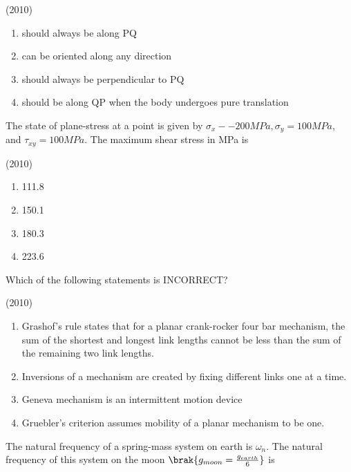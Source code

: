     \hfill{(2010)}

        
            \begin{enumerate}
                \item should always be along PQ
                \item can be oriented along any direction
                \item should always be perpendicular to PQ
                \item should be along QP when the body undergoes pure translation
            \end{enumerate}
        
		
    \item The state of plane-stress at a point is given by $\sigma_x--200MPa,\sigma_y=100MPa$, and $\tau_{xy}=100MPa$. The maximum shear stress in MPa is
    
    \hfill{(2010)}

        \begin{multicols}{4}
            \begin{enumerate}
                \item 111.8
                \item 150.1
                \item 180.3
                \item 223.6
            \end{enumerate}
        \end{multicols}

    \item Which of the following statements is INCORRECT?
    
    \hfill{(2010)}


            \begin{enumerate}
                \item Grashof's rule states that for a planar crank-rocker four bar mechanism, the sum of the shortest and longest link lengths cannot be less than the sum of the remaining two link lengths.
                \item Inversions of a mechanism are created by fixing different links one at a time.
                \item Geneva mechanism is an intermittent motion device
                \item Gruebler's criterion assumes mobility of a planar mechanism to be one.
            \end{enumerate}


    \item The natural frequency of a spring-mass system on earth is $\omega_n$. The natural frequency of this system on the moon $\brak{g_{moon}=\frac{g_{earth}}{6}}$ is
    
